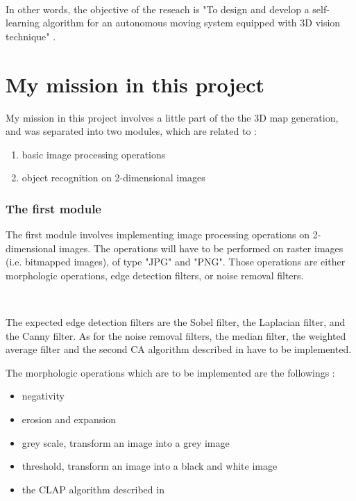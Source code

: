 ~~

In other words, the objective of the reseach is "To design and develop a self-learning algorithm for an autonomous moving system equipped with 3D vision technique" \cite{bib:niharika}.



\section{My mission in this project}

My mission in this project involves a little part of the the 3D map generation, and was separated into two modules, which are related to : 
\begin{enumerate}
	\item basic \gls{image processing} operations
	\item object recognition on 2-dimensional images
\end{enumerate}


\subsubsection{The first module}

The first module involves implementing \gls{image processing} operations on 2-dimensional images. The operations will have to be performed on raster images (i.e. bitmapped images), of type "JPG" and "PNG". Those operations are either morphologic operations, edge detection filters, or noise removal filters. 

~~

The expected edge detection filters are the Sobel filter, the Laplacian filter, and the Canny filter. As for the noise removal filters, the median filter, the weighted average filter and the second \gls{CA} algorithm described in \cite{bib:filter:CA} have to be implemented.


The morphologic operations which are to be implemented are the followings : 
\begin{itemize}
	\item negativity
	\item erosion and expansion
	\item grey scale, transform an image into a grey image
	\item threshold, transform an image into a black and white image 
	\item the \gls{CLAP} \gls{algorithm} described in \cite{bib:filter:EdgeWithCLAP}
\end{itemize}

